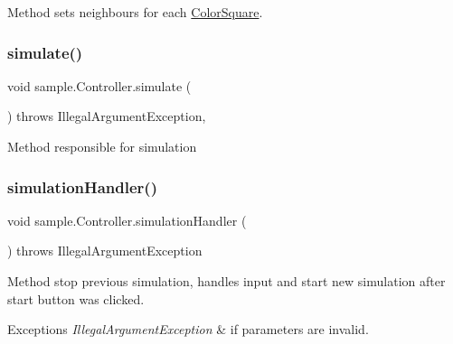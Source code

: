 Method sets neighbours for each \mbox{\hyperlink{classsample_1_1_color_square}{Color\+Square}}. \mbox{\label{classsample_1_1_controller_a946710317fcb002fb9f1f21ca32401ad}} 
\subsubsection{\texorpdfstring{simulate()}{simulate()}}
{\footnotesize\ttfamily void sample.\+Controller.\+simulate (\begin{DoxyParamCaption}{ }\end{DoxyParamCaption}) throws Illegal\+Argument\+Exception\hspace{0.3cm}{\ttfamily [inline]}, {\ttfamily [private]}}

Method responsible for simulation \mbox{\label{classsample_1_1_controller_a40542380181cd69e668251ad13af45f9}} 
\subsubsection{\texorpdfstring{simulation\+Handler()}{simulationHandler()}}
{\footnotesize\ttfamily void sample.\+Controller.\+simulation\+Handler (\begin{DoxyParamCaption}{ }\end{DoxyParamCaption}) throws Illegal\+Argument\+Exception\hspace{0.3cm}{\ttfamily [inline]}}

Method stop previous simulation, handles input and start new simulation after start button was clicked.


\begin{DoxyExceptions}{Exceptions}
{\em Illegal\+Argument\+Exception} & if parameters are invalid. \\
\hline
\end{DoxyExceptions}
\mbox{\label{classsample_1_1_controller_a550457284b984d131eefac5c4988dd70}} 

